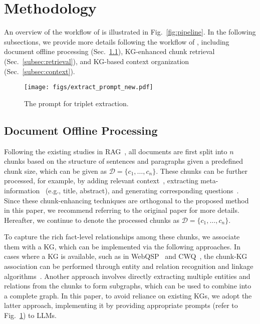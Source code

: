 \section{Methodology}
\label{sec:method}

An overview of the workflow of \modelname is illustrated in Fig.~\ref{fig:pipeline}. 
In the following subsections, we provide more details following the workflow of \modelname, including document offline processing (Sec.~\ref{subsec:offline}), KG-enhanced chunk retrieval (Sec.~\ref{subsec:retrieval}), and KG-based context organization (Sec.~\ref{subsec:context}).

\begin{figure}[t]
\centering
\texttt{[image: figs/extract\_prompt\_new.pdf]}
\caption{The prompt for triplet extraction.}
\label{fig:extract_prompt}
\end{figure}

\subsection{Document Offline Processing}
\label{subsec:offline}
Following the existing studies in RAG~\cite{patrick20rag,gao23ragsurvey,fan24ragsurvey}, all documents are first split into $n$ chunks based on the structure of sentences and paragraphs given a predefined chunk size, which can be given as $\mathcal{D} = \{c_1,\ldots,c_n\}$.
These chunks can be further processed, for example, by adding relevant context~\cite{jiang23arag,matous24aragog}, extracting meta-information~\cite{laurent24meta} (e.g., title, abstract), and generating corresponding questions~\cite{ma23queryrewriting,wang24maferw}. 
Since these chunk-enhancing techniques are orthogonal to the proposed method in this paper, we recommend referring to the original paper for more details.
Hereafter, we continue to denote the processed chunks as $\mathcal{D} = \{c_1,\ldots,c_n\}$.

To capture the rich fact-level relationships among these chunks, we associate them with a KG,  which can be implemented via the following approaches. In cases where a KG is available, such as in WebQSP~\cite{tih16webqsp} and CWQ~\cite{alon18cwq}, the chunk-KG association can be performed through entity and relation recognition and linkage algorithms~\cite{zhao23improving,tian24generating}. 
Another approach involves directly extracting multiple entities and relations from the chunks to form subgraphs, which can be used to combine into a complete graph. 
In this paper, to avoid reliance on existing KGs, we adopt the latter approach, implementing it by providing appropriate prompts (refer to Fig.~\ref{fig:extract_prompt}) to LLMs.

